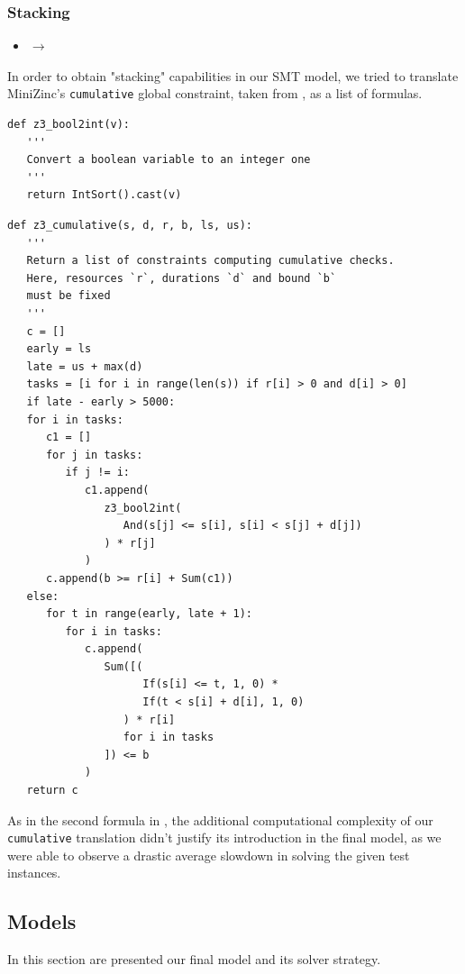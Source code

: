 \documentclass[a4paper,10pt]{article}
\newcommand{\xmark}{\ding{55}}%
\newcounter{subsubsubsection}[subsubsection]
\begin{document}
\subsubsection{Stacking}
\begin{itemize}
   \item {} $\rightarrow$ \xmark
\end{itemize}

 \label{sec:smt-cumulative}
In order to obtain "stacking" capabilities in our SMT model, we tried to translate MiniZinc's \texttt{cumulative} global constraint, taken from \cite{minizinc-lib}, as a list of formulas.

\begin{verbatim}
def z3_bool2int(v):
   '''
   Convert a boolean variable to an integer one
   '''
   return IntSort().cast(v)
\end{verbatim}

\begin{verbatim}
def z3_cumulative(s, d, r, b, ls, us):
   '''
   Return a list of constraints computing cumulative checks.
   Here, resources `r`, durations `d` and bound `b` 
   must be fixed
   '''
   c = []
   early = ls
   late = us + max(d)
   tasks = [i for i in range(len(s)) if r[i] > 0 and d[i] > 0]
   if late - early > 5000:
   for i in tasks:
      c1 = []
      for j in tasks:
         if j != i:
            c1.append(
               z3_bool2int(
                  And(s[j] <= s[i], s[i] < s[j] + d[j])
               ) * r[j]
            )
      c.append(b >= r[i] + Sum(c1))
   else:
      for t in range(early, late + 1):
         for i in tasks:
            c.append(
               Sum([(
                     If(s[i] <= t, 1, 0) * 
                     If(t < s[i] + d[i], 1, 0)
                  ) * r[i] 
                  for i in tasks
               ]) <= b
            )
   return c
\end{verbatim}

As in the second formula in , the additional computational complexity of our \texttt{cumulative} translation didn't justify its introduction in the final model, as we were able to observe a drastic average slowdown in solving the given test instances.

\subsection{Models}
In this section are presented our final model and its solver strategy.
\end{document}
